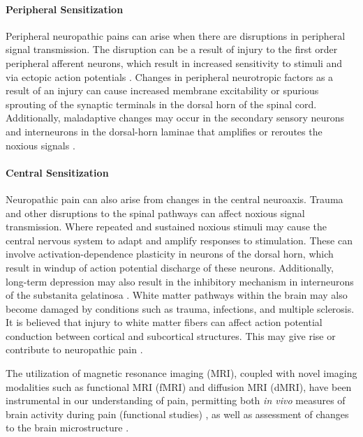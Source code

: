 \paragraph{Peripheral Sensitization}

Peripheral neuropathic pains can arise when there are disruptions in peripheral signal transmission. The disruption can be a result of injury to the first order peripheral afferent neurons, which result in increased sensitivity to stimuli and via ectopic action potentials \cite{Costigan2009}. Changes in peripheral neurotropic factors as a result of an injury can cause increased membrane excitability or spurious sprouting of the synaptic terminals in the dorsal horn of the spinal cord. Additionally, maladaptive changes may occur in the secondary sensory neurons and interneurons in the dorsal-horn laminae that amplifies or reroutes the noxious signals \cite{Elmes2004}.

\paragraph{Central Sensitization}

Neuropathic pain can also arise from changes in the central neuroaxis. Trauma and other disruptions to the spinal pathways can affect noxious signal transmission. Where repeated and sustained noxious stimuli may cause the central nervous system to adapt and amplify responses to stimulation. These can involve activation-dependence plasticity in neurons of the dorsal horn, which result in windup of action potential discharge of these neurons. Additionally, long-term depression may also result in the inhibitory mechanism in interneurons of the substanita gelatinosa \cite{Woolf2000}. White matter pathways within the brain may also become damaged by conditions such as trauma, infections, and multiple sclerosis. It is believed that injury to white matter fibers can affect action potential conduction between cortical and subcortical structures. This may give rise or contribute to neuropathic pain \cite{Geha2008}.

 The utilization of magnetic resonance imaging (MRI), coupled with novel imaging modalities such as functional MRI (fMRI) and diffusion MRI (dMRI), have been instrumental in our understanding of pain, permitting both \textit{in vivo} measures of brain activity during pain (functional studies) \cite{Davis2006}, as well as assessment of changes to the brain microstructure \cite{Hodaie2009a,Chen2015c}.
 
